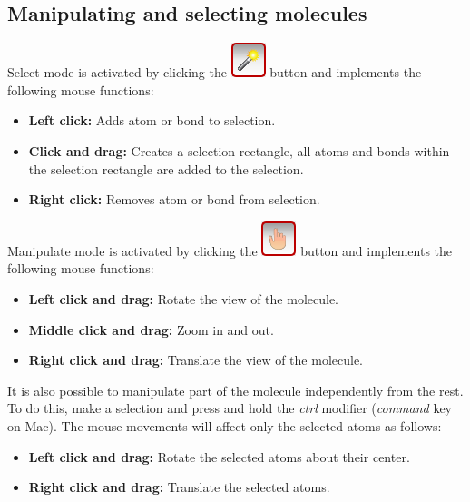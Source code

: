 \documentclass[a4paper,12pt]{article}
\begin{document}
\subsection{Manipulating and selecting molecules}

Select mode is activated by clicking the 
\includegraphics[scale=0.40]{figures/SelectButton.png} button and implements 
the following mouse functions:

\begin{itemize}
\item {\bf Left click:} Adds atom or bond to selection. 
\item {\bf Click and drag:} Creates a selection rectangle, all atoms and bonds
           within the selection rectangle are added to the selection. 
\item {\bf Right click:}  Removes atom or bond from selection.
\end{itemize}


Manipulate mode is activated by clicking the 
\includegraphics[scale=0.40]{figures/ManipulateButton.png} button and implements 
the following mouse functions:

\begin{itemize}
\item {\bf Left click and drag:} Rotate the view of the molecule.  
\item {\bf Middle click and drag:} Zoom in and out.  
\item {\bf Right click and drag:} Translate the view of the molecule.
\end{itemize}

It is also possible to manipulate part of the molecule independently from the
rest.  To do this, make a selection and press and hold the \emph{ctrl} modifier
(\emph{command} key on Mac).  The mouse movements will affect only the 
selected atoms as follows:

\begin{itemize}
\item {\bf Left click and drag:} Rotate the selected atoms about their center. 
\item {\bf Right click and drag:} Translate the selected atoms.  
\end{itemize}
\end{document}
